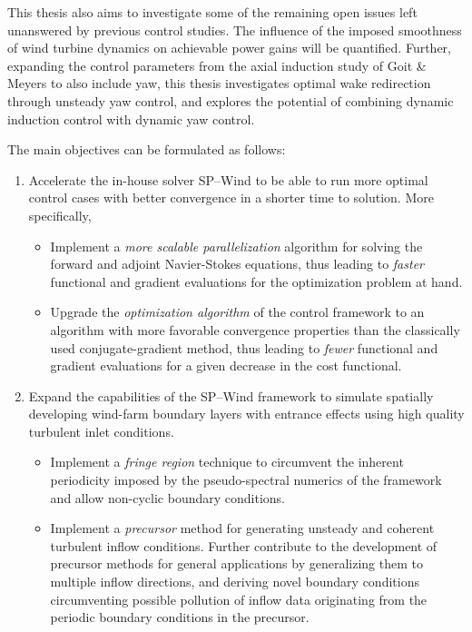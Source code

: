 This thesis also aims to investigate some of the remaining open issues left unanswered by previous control studies. The influence of the imposed smoothness of wind turbine dynamics on achievable power gains will be quantified. Further, expanding the control parameters from the axial induction study of Goit \& Meyers to also include yaw, this thesis investigates optimal wake redirection through unsteady yaw control, and explores the potential of combining dynamic induction control with dynamic yaw control. 

The main objectives can be formulated as follows: 
\begin{enumerate}
	\item Accelerate the in-house solver SP--Wind to be able to run more optimal control cases with better convergence in a shorter time to solution. More specifically, 
		\begin{itemize}
			\item Implement a  \emph{more scalable parallelization} algorithm for solving the forward and adjoint Navier-Stokes equations, thus leading to \emph{faster} functional and gradient evaluations for the optimization problem at hand.
			\item Upgrade the \emph{optimization algorithm} of the control framework to an algorithm with more favorable convergence properties than the classically used conjugate-gradient method, thus leading to \emph{fewer} functional and gradient evaluations for a given decrease in the cost functional.
		\end{itemize}
	\item Expand the capabilities of the SP--Wind framework to simulate spatially developing wind-farm boundary layers with entrance effects using high quality turbulent inlet conditions.  
		\begin{itemize}
			\item Implement a \emph{fringe region} technique to circumvent the inherent periodicity imposed by the pseudo-spectral numerics of the framework and allow non-cyclic boundary conditions. 
			\item Implement a \emph{precursor} method for generating unsteady and coherent turbulent inflow conditions. Further contribute to the development of precursor methods for general applications by generalizing them to multiple inflow directions, and deriving novel boundary conditions circumventing possible pollution of inflow data originating from the periodic boundary conditions in the precursor.
		\end{itemize}

\end{enumerate}
